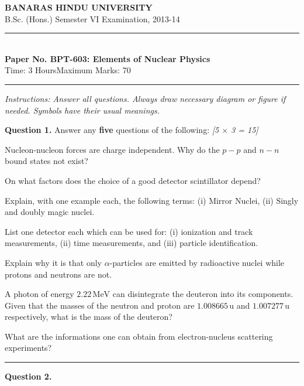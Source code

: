 \documentclass[11pt,a4paper]{article}
\newcommand{\pts}[1]{\hfill   \textit{[#1]}}
\begin{document}
\begin{center}
  {\large\bfseries BANARAS HINDU UNIVERSITY}\\[2pt]
  {\normalsize B.Sc. (Hons.) Semester VI Examination, 2013-14}\\[6pt]
  \rule{0.8\linewidth}{0.5pt}\\[6pt]
  {\large\bfseries Paper No. BPT-603: Elements of Nuclear Physics}\\[4pt]
  {\normalsize Time: 3 Hours\hfill Maximum Marks: 70}
\end{center}
\rule{\linewidth}{0.4pt}
\smallskip



\noindent   \textit{Instructions: Answer all questions. Always draw necessary diagram or figure if needed. Symbols have their usual meanings.}
\bigskip




\noindent   \textbf{Question 1.} Answer any   \textbf{five} questions of the following: \pts{5 $ \times$ 3 = 15}

\begin{parts}
  \item Nucleon-nucleon forces are charge independent. Why do the $p-p$ and $n-n$ bound states not exist?
  \item On what factors does the choice of a good detector scintillator depend?
  \item Explain, with one example each, the following terms: (i) Mirror Nuclei, (ii) Singly and doubly magic nuclei.
  \item List one detector each which can be used for: (i) ionization and track measurements, (ii) time measurements, and (iii) particle identification.
  \item Explain why it is that only $\alpha$-particles are emitted by radioactive nuclei while protons and neutrons are not.
  \item A photon of energy $2.22\, \text{MeV}$ can disintegrate the deuteron into its components. Given that the masses of the neutron and proton are $1.008665\, \text{u}$ and $1.007277\, \text{u}$ respectively, what is the mass of the deuteron?
  \item What are the informations one can obtain from electron-nucleus scattering experiments?
\end{parts}

\medskip\rule{\linewidth}{0.2pt}




\noindent   \textbf{Question 2.}
\end{document}
